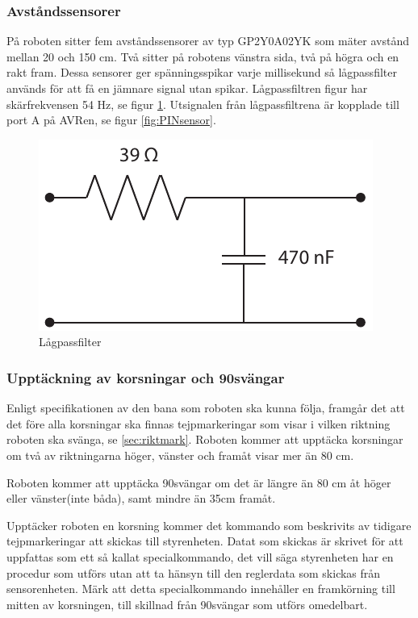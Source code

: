 \subsubsection{Avståndssensorer}
På roboten sitter fem avståndssensorer av typ GP2Y0A02YK som mäter avstånd
mellan 20 och 150 cm. Två sitter på robotens vänstra sida, två på högra och en
rakt fram. Dessa sensorer ger spänningsspikar varje millisekund så lågpassfilter
används för att få en jämnare signal utan spikar. Lågpassfiltren figur
har skärfrekvensen 54 Hz, se figur \ref{fig:lagpassfilter}. Utsignalen från
lågpassfiltrena är kopplade till port A på AVRen, se figur \ref{fig:PINsensor}.

\begin{figure}[H]
  \centering
 \includegraphics[angle=0,scale=0.7]{bilder/LPfilter.pdf}
  \caption{Lågpassfilter}
  \label{fig:lagpassfilter}
\end{figure}


\subsubsection{Upptäckning av korsningar och 90\degree svängar}
\label{sec:upptackkorsning}
Enligt specifikationen av den bana som roboten ska kunna följa, framgår det 
att det före alla korsningar ska finnas tejpmarkeringar som visar i vilken 
riktning roboten ska svänga, se \ref{sec:riktmark}. Roboten kommer att 
upptäcka korsningar om två av riktningarna höger, vänster och framåt visar 
mer än 80 cm.

Roboten kommer att upptäcka 90\degree svängar om det är längre än 80 cm åt 
höger eller vänster(inte båda), samt mindre än 35cm framåt.

Upptäcker roboten en korsning kommer det kommando som beskrivits av tidigare 
tejpmarkeringar att skickas till styrenheten. Datat som skickas är skrivet 
för att uppfattas som ett så kallat specialkommando, det vill säga 
styrenheten har en procedur som utförs utan att ta hänsyn till den reglerdata 
som skickas från sensorenheten. Märk att detta specialkommando innehåller en 
framkörning till mitten av korsningen, till skillnad från 90\degree svängar 
som utförs omedelbart.

